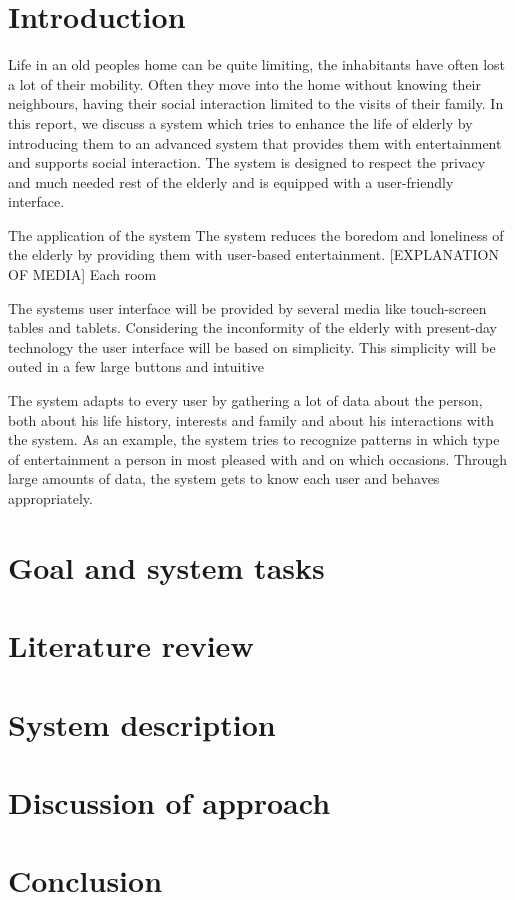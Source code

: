 \documentclass[12pt, a4paper]{article}
\begin{document}
\tableofcontents 
\newpage
\section{Introduction}

Life in an old peoples home can be quite limiting, the inhabitants have often lost a lot of their mobility. Often they move into the home without knowing their neighbours, having their social interaction limited to the visits of their family. In this report, we discuss a system which tries to enhance the life of elderly by introducing them to an advanced system that provides them with entertainment and supports social interaction. The system is designed to respect the privacy and much needed rest of the elderly and is equipped with a user-friendly interface.

The application of the system 
The system reduces the boredom and loneliness of the elderly by providing them with user-based entertainment. [EXPLANATION OF MEDIA] Each room

The systems user interface will be provided by several media like touch-screen tables and tablets. Considering the inconformity of the elderly with present-day technology the user interface will be based on simplicity. This simplicity will be outed in a few large buttons and intuitive 

The system adapts to every user by gathering a lot of data about the person, both about his life history, interests and family and about his interactions with the system. As an example, the system tries to recognize patterns in which type of entertainment a person in most pleased with and on which occasions. Through large amounts of data, the system gets to know each user and behaves appropriately.

\section{Goal and system tasks}

\section{Literature review}

\section{System description}

\section{Discussion of approach}

\section{Conclusion}
\begin{thebibliography}{x}

\end{thebibliography}
\end{document}
